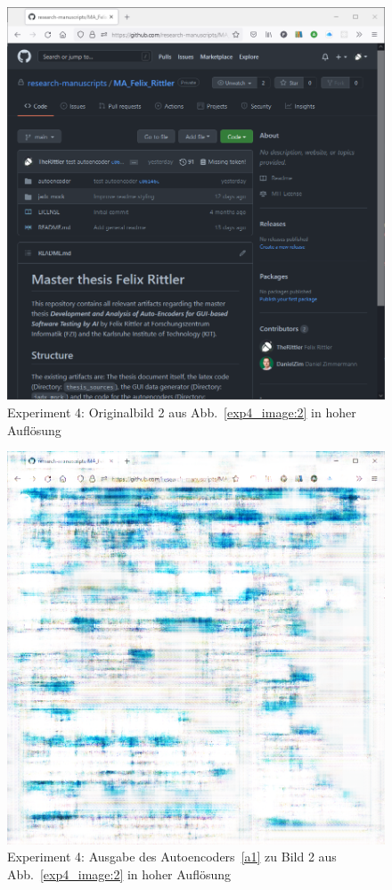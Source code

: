 \label{sec:appendix:exp4_2}
\begin{figure} [ht]
  \centering
  \includegraphics[width=\textwidth]{bilder/result_exp4/4.png}

  \caption{Experiment 4: Originalbild 2 aus Abb.~\ref{exp4_image:2} in hoher Auflösung}
\end{figure}

\begin{figure} [ht]
  \centering
  \includegraphics[width=\textwidth]{bilder/result_exp4/4_pred_a1.png}

  \caption{Experiment 4: Ausgabe des Autoencoders~\ref{a1} zu Bild 2 aus Abb.~\ref{exp4_image:2} in hoher Auflösung}
\end{figure}

